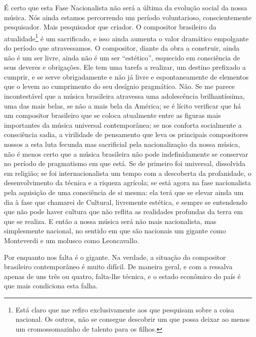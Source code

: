 É certo que esta Fase Nacionalista não será a última da evolução social
da nossa música. Nós ainda estamos percorrendo um período voluntarioso,
conscientemente pesquisador. Mais pesquisador que criador. O compositor
brasileiro da atualidade\footnote{Está claro que me refiro exclusivamente aos que pesquisam sobre a
coisa nacional. Os outros, não se consegue descobrir um que possa deixar
ao menos um cromossomazinho de talento para os filhos.} é um sacrificado, e isso ainda aumenta o
valor dramático empolgante do período que atravessamos. O compositor,
diante da obra a construir, ainda não é um ser livre, ainda não é um ser
``estético'', esquecido em consciência de seus deveres e obrigações. Ele
tem uma tarefa a realizar, um destino prefixado a cumprir, e se serve
obrigadamente e não já livre e espontaneamente de elementos que o levem
ao cumprimento do seu desígnio pragmático. Não. Se me parece
incontestável que a música brasileira atravessa uma adolescência
brilhantíssima, uma das mais belas, se não a mais bela da América; se é
lícito verificar que há um compositor brasileiro que se coloca
atualmente entre as figuras mais importantes da música universal
contemporânea; se nos conforta socialmente a consciência sadia, a
virilidade de pensamento que leva os principais compositores nossos a
esta luta fecunda mas sacrificial pela nacionalização da nossa música,
não é menos certo que a música brasileira não pode indefinidamente se
conservar no período de pragmatismo em que está. Se de primeiro foi
universal, dissolvida em religião; se foi internacionalista um tempo com
a descoberta da profanidade, o desenvolvimento da técnica e a riqueza
agrícola; se está agora na fase nacionalista pela aquisição de uma
consciência de si mesma: ela terá que se elevar ainda um dia à fase que
chamarei de Cultural, livremente estética, e sempre se entendendo que
não pode haver cultura que não reflita as realidades profundas da terra
em que se realiza. E então a nossa música será não mais nacionalista,
mas simplesmente nacional, no sentido em que são nacionais um gigante
como Monteverdi e um molusco como Leoncavallo.

Por enquanto nos falta é o gigante. Na verdade, a situação do compositor
brasileiro contemporâneo é muito difícil. De maneira geral, e com a
ressalva apenas de uns três ou quatro, falta-lhe técnica, e o estado
econômico do país é que mais condiciona esta falha.

